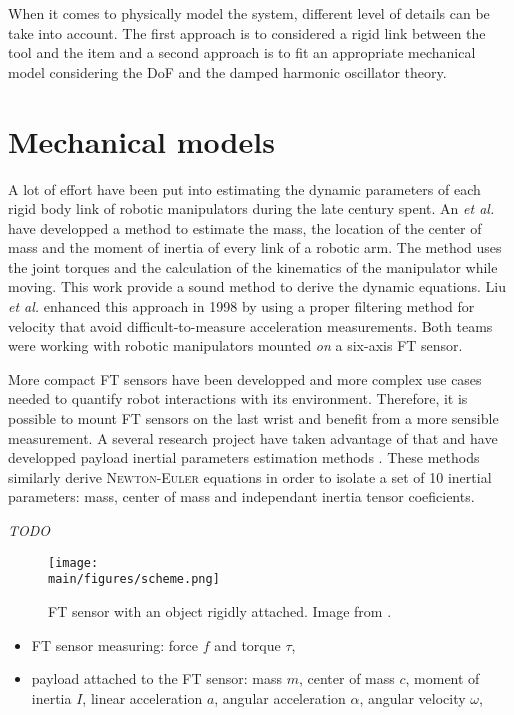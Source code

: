 \documentclass[/home/francois/latex/report/main.tex]{subfiles}
\begin{document}
When it comes to physically model the system, different level of details can be take into account. The first approach is to considered a rigid link between the tool and the item and a second approach is to fit an appropriate mechanical model considering the \ac{DoF} and the damped harmonic oscillator theory.

\section{Mechanical models}
\label{section:mechanical-models}

A lot of effort have been put into estimating the dynamic parameters of each rigid body link of robotic manipulators during the late century spent. An \textit{et al.} \cite{An1985} have developped a method to estimate the mass, the location of the center of mass and the moment of inertia of every link of a robotic arm. The method uses the joint torques and the calculation of the kinematics of the manipulator while moving. This work provide a sound method to derive the dynamic equations. Liu \textit{et al.} enhanced this approach in 1998 \cite{Liu1998} by using a proper filtering method for velocity that avoid difficult-to-measure acceleration measurements. Both teams were working with robotic manipulators mounted \textit{on}
a six-axis \ac{FT} sensor.

More compact \ac{FT} sensors have been developped and more complex use cases needed to quantify robot interactions with its environment. Therefore, it is possible to mount \ac{FT} sensors on the last wrist and benefit from a more sensible measurement. A several research project have taken advantage of that and have developped payload inertial parameters estimation methods \cite{Kubus2008, Kubus2007, Kubus2014, Farsoni2018}. These methods similarly derive \textsc{Newton-Euler} equations in order to isolate a set of 10 inertial parameters: mass, center of mass and independant inertia tensor coeficients. 


\textit{TODO}

\begin{figure}
  \centering
  \texttt{[image: \\main/figures/scheme.png]}
  \caption{\ac{FT} sensor with an object rigidly attached. Image from \cite{Kubus2007}.}
\end{figure}

\begin{itemize}
 \item \ac{FT} sensor measuring: force $f$ and torque $\tau$,
 \item payload attached to the \ac{FT} sensor: mass $m$, center of mass $c$, moment of inertia $I$, linear acceleration $a$, angular acceleration $\alpha$, angular velocity $\omega$,
\end{itemize}
\end{document}
